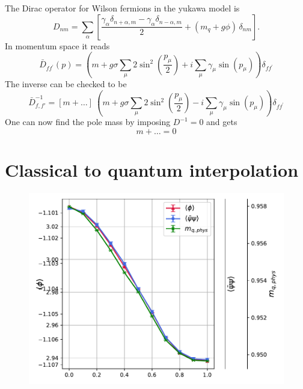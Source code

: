 The Dirac operator for Wilson fermions in the yukawa model is
\begin{equation*}
D_{n m}=\sum_\alpha\left[\frac{\gamma_\alpha \delta_{n+\alpha, m} - \gamma_\alpha \delta_{n-\alpha, m}}{2} + (m_q + g \phi) \, \delta_{n m}\right] .
\end{equation*}
In momentum space it reads
\begin{equation*}
\bar{D}_{f f^{\prime}}(p)=\left(m+ g \sigma \sum_\mu 2 \sin ^2\left(\frac{p_\mu}{2}\right)+i \sum_\mu \gamma_\mu \sin \left(p_\mu\right)\right) \delta_{f f^{\prime}}
\end{equation*}
The inverse can be checked to be 
\begin{equation*}
    \bar D_{f,f'} ^{-1} = \left[m + \dots\right] \ \left(m+ g \sigma \sum_\mu 2 \sin ^2\left(\frac{p_\mu}{2}\right) - i \sum_\mu \gamma_\mu \sin \left(p_\mu\right)\right) \delta_{f f^{\prime}}
\end{equation*}
One can now find the pole mass by imposing $D^{-1} = 0$ and gets 
\begin{equation*}
    m + \dots = 0
\end{equation*}

\newpage
\section{Classical to quantum interpolation}
\label{sec:classical_to_quantum}

\begin{figure}
    \centering
    \includegraphics[scale=0.7]{figures/slide_broken/mag_cond.pdf}
\end{figure}


